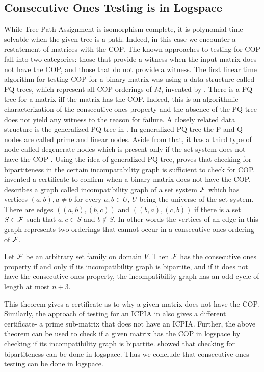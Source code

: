 \documentclass{llncs}
\def\cF{{\cal F}}
\begin{document}
\subsection{Consecutive Ones Testing is in Logspace}
While Tree Path Assignment is isomorphism-complete, it is polynomial
time solvable when the given tree is a path.  Indeed, in this case we
encounter a restatement of matrices with the COP.  The known
approaches to testing for COP fall into two categories: those that
provide a witness when the input matrix does not have the COP, and those
that do not provide a witness.  The first linear time algorithm for
testing COP for a binary matrix was using a data structure called PQ
trees, which represent all COP orderings of $M$, invented by
\cite{bl76}. There is a PQ tree for a matrix iff the matrix has the COP.
Indeed, this is an algorithmic characterization of the consecutive
ones property and the absence of the PQ-tree does not yield any
witness to the reason for failure.  A closely related data structure
is the generalized PQ tree in \cite{mcc04}.  In generalized PQ tree
the P and Q nodes are called prime and linear nodes. Aside from that,
it has a third type of node called degenerate nodes which is present
only if the set system does not have the COP \cite{mcc04}.  Using the idea
of generalized PQ tree, \cite{mcc04} proves that checking for
bipartiteness in the certain incomparability graph is sufficient to
check for COP.  \cite{mcc04} invented a certificate to confirm when a
binary matrix does not have the COP.  \cite{mcc04} describes a graph
called incompatibility graph of a set system $\cF$ which has vertices
$(a,b), a \ne b$ for every $a, b \in U$, $U$ being the universe of the
set system. There are edges $((a,b),(b,c))$ and $((b,a),(c,b))$ if
there is a set $S \in \cF$ such that $a, c \in S$ and $b \notin S$. In
other words the vertices of an edge in this graph represents two
orderings that cannot occur in a consecutive ones ordering of $\cF$.
\begin{theorem}
  Let $\cF$ be an arbitrary set family on domain $V$. Then $\cF$ has
  the consecutive ones property if and only if its incompatibility
  graph is bipartite, and if it does not have the consecutive ones
  property, the incompatibility graph has an odd cycle of length at
  most $n+3$.
\end{theorem}
This theorem gives a certificate as to why a given matrix does not
have the COP.  Similarly, the approach of testing for an ICPIA in
\cite{nsnrs09} also gives a different certificate- a prime sub-matrix
that does not have an ICPIA.  Further, the above theorem can be used
to check if a given matrix has the COP in logspace by checking if its
incompatibility graph is bipartite. \cite{rei84} showed that checking
for bipartiteness can be done in logspace. Thus we conclude that
consecutive ones testing can be done in logspace.
\end{document}
